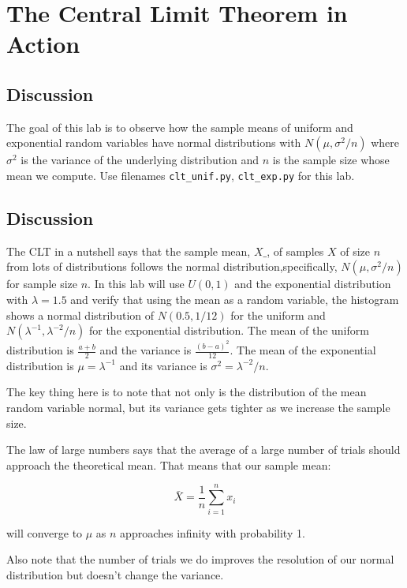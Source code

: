 \chapter{The Central Limit Theorem in Action}

\setcounter{problem}{1}

\section{Discussion}

\begin{fullwidth}

The goal of this lab is to observe how the sample means of uniform and exponential random variables have normal distributions with $N(\mu, \sigma^2/n)$ where $\sigma^2$ is the variance of the underlying distribution and $n$ is the sample size whose mean we compute. Use filenames {\tt clt\_unif.py}, {\tt clt\_exp.py} for this lab.

\section{Discussion}

The CLT in a nutshell says that the sample mean, $X\_$, of samples $X$ of size $n$
from lots of distributions follows the normal distribution,specifically, $N(\mu, \sigma^2/n)$ for sample size $n$.
 In this lab will use $U(0,1)$ and the exponential distribution with $\lambda=1.5$
and verify that using the mean as a random variable, the histogram shows a normal distribution of $N(0.5,1/12)$ for the uniform and $N(\lambda^{-1}, \lambda^{-2}/n)$ for the exponential distribution. The mean of the uniform distribution is $\frac{a+b}{2}$ and the variance is $\frac{(b-a)^2}{12}$. The mean of the exponential distribution is $\mu = \lambda^{-1}$ and its variance is $\sigma^2 = \lambda^{-2}/n$.

The key thing here is to note that not only is the distribution of the mean random variable normal, but its variance gets tighter as we increase the sample size. 

The law of large numbers says that the average of a large number of trials should approach the theoretical mean. That means that our sample mean:

\[
\bar X = \frac{1}{n} \sum_{i=1}^{n} x_i
\]

\noindent will converge to $\mu$ as $n$ approaches infinity with probability 1.

Also note that the number of trials we do improves the resolution of our normal distribution but doesn't change the variance.


\end{fullwidth}
